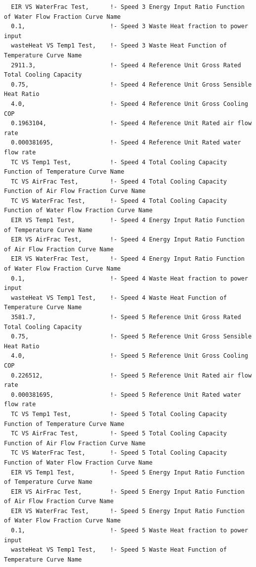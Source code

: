 \begin{lstlisting}
  EIR VS WaterFrac Test,      !- Speed 3 Energy Input Ratio Function of Water Flow Fraction Curve Name
  0.1,                        !- Speed 3 Waste Heat fraction to power input
  wasteHeat VS Temp1 Test,    !- Speed 3 Waste Heat Function of Temperature Curve Name
  2911.3,                     !- Speed 4 Reference Unit Gross Rated Total Cooling Capacity
  0.75,                       !- Speed 4 Reference Unit Gross Sensible Heat Ratio
  4.0,                        !- Speed 4 Reference Unit Gross Cooling COP
  0.1963104,                  !- Speed 4 Reference Unit Rated air flow rate
  0.000381695,                !- Speed 4 Reference Unit Rated water flow rate
  TC VS Temp1 Test,           !- Speed 4 Total Cooling Capacity Function of Temperature Curve Name
  TC VS AirFrac Test,         !- Speed 4 Total Cooling Capacity Function of Air Flow Fraction Curve Name
  TC VS WaterFrac Test,       !- Speed 4 Total Cooling Capacity Function of Water Flow Fraction Curve Name
  EIR VS Temp1 Test,          !- Speed 4 Energy Input Ratio Function of Temperature Curve Name
  EIR VS AirFrac Test,        !- Speed 4 Energy Input Ratio Function of Air Flow Fraction Curve Name
  EIR VS WaterFrac Test,      !- Speed 4 Energy Input Ratio Function of Water Flow Fraction Curve Name
  0.1,                        !- Speed 4 Waste Heat fraction to power input
  wasteHeat VS Temp1 Test,    !- Speed 4 Waste Heat Function of Temperature Curve Name
  3581.7,                     !- Speed 5 Reference Unit Gross Rated Total Cooling Capacity
  0.75,                       !- Speed 5 Reference Unit Gross Sensible Heat Ratio
  4.0,                        !- Speed 5 Reference Unit Gross Cooling COP
  0.226512,                   !- Speed 5 Reference Unit Rated air flow rate
  0.000381695,                !- Speed 5 Reference Unit Rated water flow rate
  TC VS Temp1 Test,           !- Speed 5 Total Cooling Capacity Function of Temperature Curve Name
  TC VS AirFrac Test,         !- Speed 5 Total Cooling Capacity Function of Air Flow Fraction Curve Name
  TC VS WaterFrac Test,       !- Speed 5 Total Cooling Capacity Function of Water Flow Fraction Curve Name
  EIR VS Temp1 Test,          !- Speed 5 Energy Input Ratio Function of Temperature Curve Name
  EIR VS AirFrac Test,        !- Speed 5 Energy Input Ratio Function of Air Flow Fraction Curve Name
  EIR VS WaterFrac Test,      !- Speed 5 Energy Input Ratio Function of Water Flow Fraction Curve Name
  0.1,                        !- Speed 5 Waste Heat fraction to power input
  wasteHeat VS Temp1 Test,    !- Speed 5 Waste Heat Function of Temperature Curve Name

\end{lstlisting}
